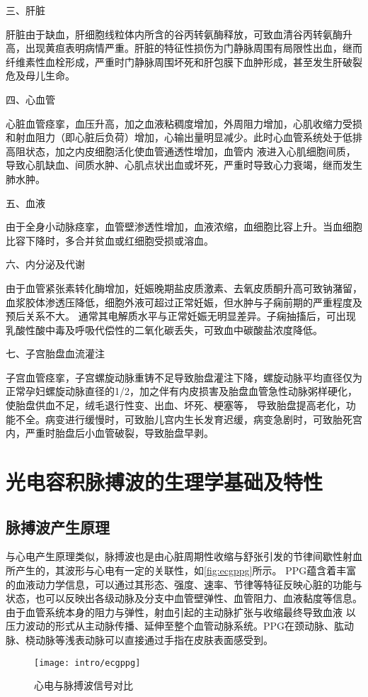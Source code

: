 三、肝脏

肝脏由于缺血，肝细胞线粒体内所含的谷丙转氨酶释放，可致血清谷丙转氨酶升高，出现黄疸表明病情严重。肝脏的特征性损伤为门静脉周围有局限性出血，继而纤维素性血栓形成，严重时门静脉周围坏死和肝包膜下血肿形成，甚至发生肝破裂危及母儿生命。

四、心血管

心脏血管痉挛，血压升高，加之血液粘稠度增加，外周阻力增加，心肌收缩力受损和射血阻力（即心脏后负荷）增加，心输出量明显减少。此时心血管系统处于低排高阻状态，加之内皮细胞活化使血管通透性增加，血管内
液进入心肌细胞间质，导致心肌缺血、间质水肿、心肌点状出血或坏死，严重时导致心力衰竭，继而发生肺水肿。

五、血液

由于全身小动脉痉挛，血管壁渗透性增加，血液浓缩，血细胞比容上升。当血细胞比容下降时，多合并贫血或红细胞受损或溶血。

六、内分泌及代谢

由于血管紧张素转化酶增加，妊娠晚期盐皮质激素、去氧皮质酮升高可致钠潴留，血浆胶体渗透压降低，细胞外液可超过正常妊娠，但水肿与子痫前期的严重程度及预后关系不大。
通常其电解质水平与正常妊娠无明显差异。子痫抽搐后，可出现乳酸性酸中毒及呼吸代偿性的二氧化碳丢失，可致血中碳酸盐浓度降低。

七、子宫胎盘血流灌注

子宫血管痉挛，子宫螺旋动脉重铸不足导致胎盘灌注下降，螺旋动脉平均直径仅为正常孕妇螺旋动脉直径的1/2，加之伴有内皮损害及胎盘血管急性动脉粥样硬化，使胎盘供血不足，绒毛退行性变、出血、坏死、梗塞等，
导致胎盘提高老化，功能不全。病变进行缓慢时，可致胎儿宫内生长发育迟缓，病变急剧时，可致胎死宫内，严重时胎盘后小血管破裂，导致胎盘早剥。
\section{光电容积脉搏波的生理学基础及特性}
\subsection{脉搏波产生原理}
与心电产生原理类似，脉搏波也是由心脏周期性收缩与舒张引发的节律间歇性射血所产生的，其波形与心电有一定的关联性，如\autoref{fig:ecgppg}所示\cite{Allen2007}。
PPG蕴含着丰富的血液动力学信息，可以通过其形态、强度、速率、节律等特征反映心脏的功能与状态，也可以反映出各级动脉及分支中血管壁弹性、血管阻力、血液黏度等信息。
由于血管系统本身的阻力与弹性，射血引起的主动脉扩张与收缩最终导致血液
以压力波动的形式从主动脉传播、延伸至整个血管动脉系统。PPG在颈动脉、肱动脉、桡动脉等浅表动脉可以直接通过手指在皮肤表面感受到\cite{PPGYY}。
\begin{figure}[htbp]
    \centering
    \texttt{[image: intro/ecgppg]}
    \caption[心电与脉搏波信号对比]{\label{fig:ecgppg}心电与脉搏波信号对比\cite{Allen2007}}
\end{figure}

